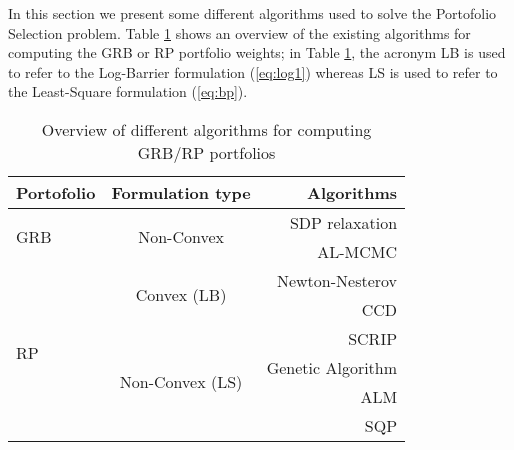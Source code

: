 In this section we present some different algorithms used to solve the Portofolio Selection problem. Table \ref{tab:t} shows an overview of the existing algorithms for computing the GRB or RP portfolio weights; in Table \ref{tab:t}, the acronym LB is used to refer to the Log-Barrier formulation (\ref{eq:log1}) whereas LS is used to refer to the Least-Square formulation (\ref{eq:bp}).
\begin{table}
\begin{center}
\begin{tabular}{| l | c| r |}
\hline
    \textbf{Portofolio} &\textbf{Formulation type}& \textbf{Algorithms}  \\ \hline
    \multirow{2}{4em}{GRB}& \multirow{2}{6em}{Non-Convex}  &SDP relaxation \cite{sdp}  \\ \cline{3-3}
     &  &AL-MCMC \cite{sdp}\\ \hline
    \multirow{7}{4em}{RP}& \multirow{2}{6em}{Convex (LB)}  &Newton-Nesterov \cite{spinu}\\\cline{3-3}     
    &  & CCD \cite{ccd}\\ \cline{2-3}
     &\multirow{4}{8em}{Non-Convex (LS)} & SCRIP \cite{scrip}\\ \cline{3-3}
    && Genetic Algorithm \cite{genetic} \\\cline{3-3}
    && ALM \cite{tutuncu}\\ \cline{3-3}
    && SQP \cite{erc}\\ 
    \hline
\end{tabular}
\end{center}
\caption{Overview of different algorithms for computing GRB/RP portfolios}
\label{tab:t}
\end{table}

